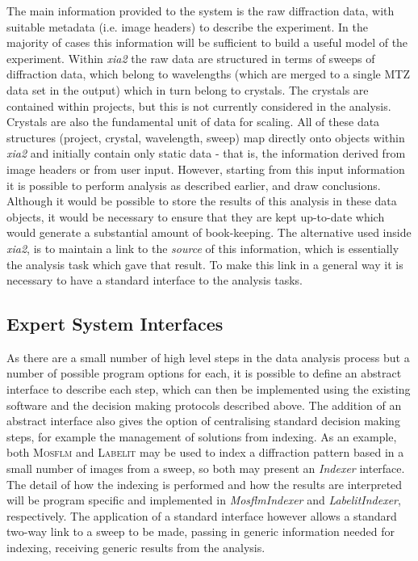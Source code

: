 \documentclass[preprint,pdf]{iucr}
\begin{document}
The main information provided to the system is the raw diffraction
data, with suitable metadata (i.e. image headers) to describe the
experiment. In the majority of
cases this information will be sufficient to build
a useful model of the experiment. Within \emph{xia2} the raw data are
structured in terms of sweeps of diffraction data, which belong to
wavelengths (which are merged to a single MTZ data set in the output)
which in turn belong to crystals. The crystals are contained within
projects, but this is not currently considered in the analysis. Crystals
are also the fundamental unit of data for scaling. All of these
data structures (project, crystal, wavelength, sweep) map directly onto
objects within \emph{xia2} and initially contain only static data -
that is, the information derived from image headers or from user
input. However, starting from this input information it is possible to
perform analysis as described earlier, and draw 
conclusions. Although it would be possible to store the results of
this analysis in these data objects, it would be necessary to ensure
that they are kept up-to-date which would generate a substantial
amount of book-keeping. The alternative used inside
\emph{xia2}, is to maintain a link to the
\emph{source} of this information, which is essentially the analysis
task which gave that result. To make this link in a general
way it is necessary to have a standard interface to the analysis
tasks.

\subsection{Expert System Interfaces}

As there are a small number of high level steps in the data analysis
process but a number of possible program options for each, it is
possible to define an abstract interface to describe each step, which
can then be implemented using the existing software 
and the decision making protocols described above. The addition of an
abstract interface also gives the option of centralising standard
decision making steps, for example the management of solutions from
indexing. As an example, both \textsc{Mosflm} and \textsc{Labelit} may be used to index
a diffraction pattern based in a small number of images from a sweep,
so both may present an \emph{Indexer} interface. The detail of how the
indexing is performed and how the results are interpreted will be
program specific and implemented in \emph{MosflmIndexer} and
\emph{LabelitIndexer}, respectively. The application of a standard
interface however allows a standard two-way link to a sweep to be
made, passing in generic information needed for indexing, receiving
generic results from the analysis.
\end{document}
